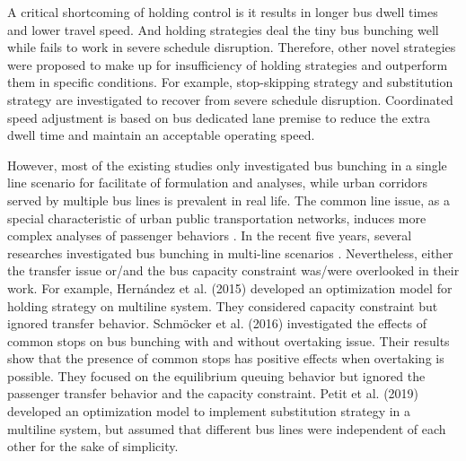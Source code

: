 \documentclass[smallextended]{svjour3}       %
\begin{document}
\begin{Abstract}
A critical shortcoming of holding control is it results in longer bus dwell times and lower travel speed.
And holding strategies deal the tiny bus bunching well while fails to work in severe schedule disruption.
Therefore, other novel strategies were proposed to make up for insufficiency of holding strategies and outperform them in specific conditions.
For example, stop-skipping strategy \citep{2003Fu,2005Sun} 
and substitution strategy \citep{2018Petit,2019Petit} are investigated to recover from severe schedule disruption.
Coordinated speed adjustment \citep{2011Daganzo} is based on bus dedicated lane premise to reduce the extra dwell time and maintain an acceptable operating speed.

However, most of the existing studies only investigated bus bunching in a single line scenario for facilitate of formulation and analyses,
while urban corridors served by multiple bus lines is prevalent in real life. 
The common line issue, as a special characteristic of urban public transportation networks, induces more complex analyses of passenger behaviors 
\citep{2015Argote-Cabanero}.
In the recent five years, several researches investigated bus bunching in multi-line scenarios 
\citep{2015Carlos,2015Argote-Cabanero,2016Sun,2019Petit,2020Seman}. %
Nevertheless, either the transfer issue or/and the bus capacity constraint was/were overlooked in their work.
For example, Hernández et al. (2015) developed an optimization model for holding strategy on multiline system.
They considered capacity constraint but ignored transfer behavior.
Schmöcker et al. (2016) investigated the effects of common stops 
on bus bunching with and without overtaking issue. 
Their results show that the presence of common stops has positive effects 
when overtaking is possible.
They focused on the equilibrium queuing behavior 
but ignored the passenger transfer behavior and the capacity constraint. 
Petit et al. (2019) developed an optimization model to implement substitution strategy 
in a multiline system, but assumed that 
different bus lines were independent of each other for the sake of simplicity. 


\end{Abstract}
\end{document}
